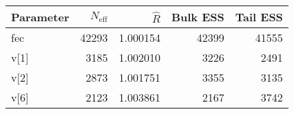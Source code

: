 \begin{table}[!h]
\centering
\begin{tabular}{>{\raggedright\arraybackslash}p{2cm}rrrr}
\toprule
Parameter & $N_{\text{eff}}$ & $\widehat{R}$ & Bulk ESS & Tail ESS\\
\midrule
\rowcolor{gray!6}  fec & 42293 & 1.000154 & 42399 & 41555\\
v[1] & 3185 & 1.002010 & 3226 & 2491\\
\rowcolor{gray!6}  v[2] & 2873 & 1.001751 & 3355 & 3135\\
v[6] & 2123 & 1.003861 & 2167 & 3742\\
\bottomrule
\end{tabular}
\end{table}